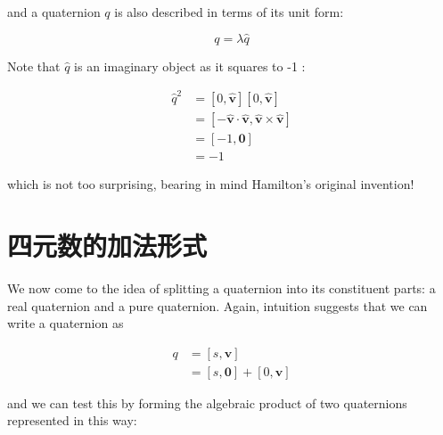 and a quaternion $q$ is also described in terms of its unit form:

$$
    q=\lambda \hat{q}
$$

Note that $\hat{q}$ is an imaginary object as it squares to -1 :

$$
    \begin{aligned}
        \hat{q}^{2} & =[0, \hat{\mathbf{v}}][0, \hat{\mathbf{v}}]                                           \\
                    & =[-\hat{\mathbf{v}} \cdot \hat{\mathbf{v}}, \hat{\mathbf{v}} \times \hat{\mathbf{v}}] \\
                    & =[-1, \mathbf{0}]                                                                     \\
                    & =-1
    \end{aligned}
$$

which is not too surprising, bearing in mind Hamilton's original invention!

\section{四元数的加法形式}
We now come to the idea of splitting a quaternion into its constituent parts: a real quaternion and a pure quaternion. Again, intuition suggests that we can write a quaternion as

$$
    \begin{aligned}
        q & =[s, \mathbf{v}]                 \\
          & =[s, \mathbf{0}]+[0, \mathbf{v}]
    \end{aligned}
$$

and we can test this by forming the algebraic product of two quaternions represented in this way:

